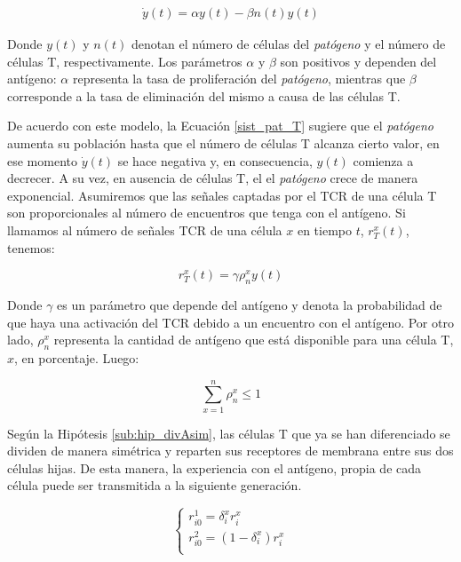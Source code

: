 \begin{equation}
	\label{sist_pat_T}
	\begin{array}{ll}
	\dot{y}(t) = \alpha y(t) - \beta n(t)y(t)
	\end{array}
\end{equation} 

Donde $y(t)$ y $n(t)$ denotan el número de células del \textit{patógeno} y el número de células T, respectivamente. Los parámetros $\alpha$ y $\beta$ son positivos y dependen del antígeno: $\alpha$ representa la tasa de proliferación del \textit{patógeno}, mientras que $\beta$ corresponde a la tasa de eliminación del mismo a causa de las células T.

De acuerdo con este modelo, la Ecuación \ref{sist_pat_T} sugiere que el \textit{patógeno} aumenta su población hasta que el número de células T alcanza cierto valor, en ese momento $\dot{y}(t)$ se hace negativa y, en consecuencia, $y(t)$ comienza a decrecer. A su vez, en ausencia de células T, el el \textit{patógeno} crece de manera exponencial. Asumiremos que las señales captadas por el TCR de una célula T son proporcionales al número de encuentros que tenga con el antígeno. Si llamamos al número de señales TCR de una célula $x$ en tiempo $t$, $r_{T}^{x}(t)$, tenemos:

\begin{equation}
	\label{ec:rhotau}
	r_{T}^{x}(t) = \gamma\rho_{n}^{x}y(t)
\end{equation}

Donde $\gamma$ es un parámetro que depende del antígeno y denota la probabilidad de que haya una activación del TCR debido a un encuentro con el antígeno. Por otro lado, $\rho_{n}^{x}$ representa la cantidad de antígeno que está disponible para una célula T, $x$, en porcentaje. Luego:

\begin{equation}
	\sum_{x=1}^{n} \rho_{n}^{x} \leq 1
\end{equation}

Según la Hipótesis \ref{sub:hip_divAsim}, las células T que ya se han diferenciado se dividen de manera simétrica y reparten sus receptores de membrana entre sus dos células hijas. De esta manera, la experiencia con el antígeno, propia de cada célula puede ser transmitida a la siguiente generación.

\begin{equation}
	\label{sist:div_sim}
	\left\{ \begin{array}{l}
	r_{i0}^{1}= \delta_{i}^{x} r_{i}^{x}\\
	r_{i0}^{2}= (1-\delta_{i}^{x}) r_{i}^{x} \\
	\end{array}
	\right.
\end{equation}


